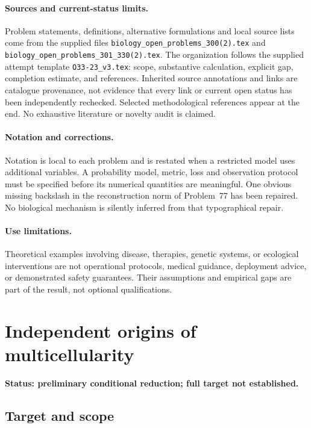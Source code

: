 \documentclass[11pt]{article}
\begin{document}
\paragraph{Sources and current-status limits.}
Problem statements, definitions, alternative formulations and local source lists
come from the supplied files
\texttt{biology\_open\_problems\_300(2).tex} and
\texttt{biology\_open\_problems\_301\_330(2).tex}.
The organization follows the supplied attempt template
\texttt{O33-23\_v3.tex}: scope, substantive calculation, explicit gap,
completion estimate, and references. Inherited source annotations and links are
catalogue provenance, not evidence that every link or current open status has
been independently rechecked. Selected methodological references appear at the
end. No exhaustive literature or novelty audit is claimed.

\paragraph{Notation and corrections.}
Notation is local to each problem and is restated when a restricted model uses
additional variables. A probability model, metric, loss and observation protocol
must be specified before its numerical quantities are meaningful. One obvious
missing backslash in the reconstruction norm of Problem~77 has been repaired.
No biological mechanism is silently inferred from that typographical repair.

\paragraph{Use limitations.}
Theoretical examples involving disease, therapies, genetic systems, or ecological
interventions are not operational protocols, medical guidance, deployment advice,
or demonstrated safety guarantees. Their assumptions and empirical gaps are part
of the result, not optional qualifications.


\section*{Independent origins of multicellularity}
\label{prob:307}
\noindent\textbf{Status: preliminary conditional reduction; full target not established.}
\subsection{Target and scope}
\end{document}
